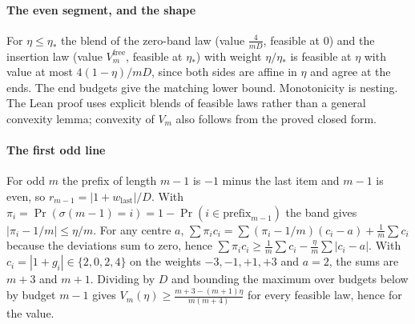 
\paragraph{The even segment, and the shape} For $\eta\le\eta_{*}$ the blend of the zero-band
law (value $\frac{4}{mD}$, feasible at $0$) and the insertion law (value $V^{\mathrm{free}}_{m}$,
feasible at $\eta_{*}$) with weight $\eta/\eta_{*}$ is feasible at $\eta$ with value at most
$4(1-\eta)/mD$, since both sides are affine in $\eta$ and agree at the ends. The end budgets
give the matching lower bound. Monotonicity is nesting. The Lean proof uses explicit blends of
feasible laws rather than a general convexity lemma; convexity of $V_m$ also follows from the proved
closed form.


\paragraph{The first odd line} For odd $m$ the prefix of
length $m-1$ is $-1$ minus the last item and $m-1$ is even, so
$r_{m-1}=|1+w_{\mathrm{last}}|/D$. With $\pi_{i}=\Pr(\sigma(m-1)=i)=1-\Pr(i\in
\mathrm{prefix}_{m-1})$ the band gives $|\pi_{i}-1/m|\le\eta/m$. For any centre $a$,
$\sum\pi_{i}c_{i}=\sum(\pi_{i}-1/m)(c_{i}-a)+\frac1m\sum c_{i}$ because the deviations sum
to zero, hence $\sum\pi_{i}c_{i}\ge\frac1m\sum c_{i}-\frac\eta m\sum|c_{i}-a|$. With
$c_{i}=|1+g_{i}|\in\{2,0,2,4\}$ on the weights $-3,-1,+1,+3$ and $a=2$, the sums are $m+3$
and $m+1$. Dividing by $D$ and bounding the maximum over budgets below by budget $m-1$ gives
$V_{m}(\eta)\ge\frac{m+3-(m+1)\eta}{m(m+4)}$ for every feasible law, hence for the value.


